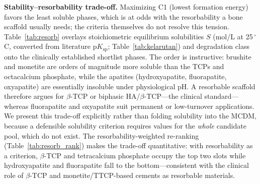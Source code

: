 \documentclass[review,11pt,a4paper]{elsarticle}
\begin{document}
\textbf{Stability--resorbability trade-off.} Maximizing C1 (lowest formation energy) favors the least soluble phases, which is at odds with the resorbability a bone scaffold usually needs; the criteria themselves do not resolve this tension. Table~\ref{tab:resorb} overlays stoichiometric equilibrium solubilities $S$ (mol/L at 25\,$^\circ$C, converted from literature p$K_\mathrm{sp}$; Table~\ref{tab:kelarutan}) and degradation class~\cite{elliott1994,dorozhkin2009,wang2008} onto the clinically established shortlist phases. The order is instructive: brushite and monetite are orders of magnitude more soluble than the TCPs and octacalcium phosphate, while the apatites (hydroxyapatite, fluorapatite, oxyapatite) are essentially insoluble under physiological pH. A resorbable scaffold therefore argues for $\beta$-TCP or biphasic HA/$\beta$-TCP---the clinical standard---whereas fluorapatite and oxyapatite suit permanent or low-turnover applications. We present this trade-off explicitly rather than folding solubility into the MCDM, because a defensible solubility criterion requires values for the \emph{whole} candidate pool, which do not exist. The resorbability-weighted re-ranking (Table~\ref{tab:resorb_rank}) makes the trade-off quantitative: with resorbability as a criterion, $\beta$-TCP and tetracalcium phosphate occupy the top two slots while hydroxyapatite and fluorapatite fall to the bottom---consistent with the clinical role of $\beta$-TCP and monetite/TTCP-based cements as resorbable materials.
\end{document}
